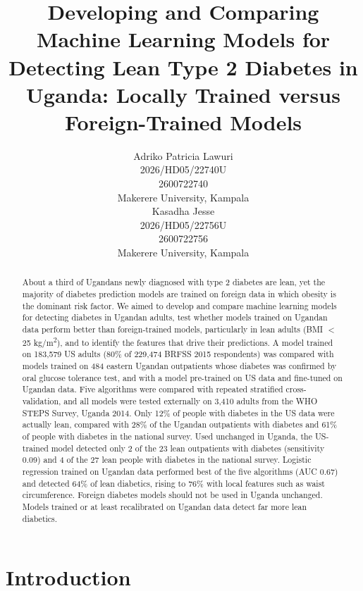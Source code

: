 \documentclass[11pt]{article}
\title{Developing and Comparing Machine Learning Models for Detecting Lean Type 2 Diabetes in Uganda: Locally Trained versus Foreign-Trained Models}
\author{Adriko Patricia Lawuri \\
  2026/HD05/22740U \\
  2600722740 \\
  Makerere University, Kampala \\\And
  Kasadha Jesse \\
  2026/HD05/22756U \\
  2600722756 \\
  Makerere University, Kampala \\}
\begin{document}
\maketitle

\begin{abstract}
About a third of Ugandans newly diagnosed with type 2 diabetes are lean, yet the majority of diabetes prediction models are trained on foreign data in which obesity is the dominant risk factor. We aimed to develop and compare machine learning models for detecting diabetes in Ugandan adults, test whether models trained on Ugandan data perform better than foreign-trained models, particularly in lean adults (BMI $<$ 25 kg/m\textsuperscript{2}), and to identify the features that drive their predictions.
 A model trained on 183,579 US adults (80\% of 229,474 BRFSS 2015 respondents) was compared with models trained on 484 eastern Ugandan outpatients whose diabetes was confirmed by oral glucose tolerance test, and with a model pre-trained on US data and fine-tuned on Ugandan data.
 Five algorithms were compared with repeated stratified cross-validation, and all models were tested externally on 3,410 adults from the WHO STEPS Survey, Uganda 2014.
 Only 12\% of people with diabetes in the US data were actually lean, compared with 28\% of the Ugandan outpatients with diabetes and 61\% of people with diabetes in the national survey. Used unchanged in Uganda, the US-trained model detected only 2 of the 23 lean outpatients with diabetes (sensitivity 0.09) and 4 of the 27 lean people with diabetes in the national survey. Logistic regression trained on Ugandan data performed best of the five algorithms (AUC 0.67) and detected 64\% of lean diabetics, rising to 76\% with local features such as waist circumference.
 Foreign diabetes models should not be used in Uganda unchanged. Models trained or at least recalibrated on Ugandan data detect far more lean diabetics.
\end{abstract}

\section{Introduction}
\end{document}
